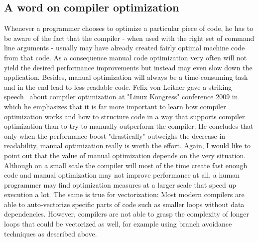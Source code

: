 \subsection{A word on compiler optimization}
Whenever a programmer chooses to optimize a particular piece of code, he has to be aware of the fact that the compiler - when used with the right set of command line arguments - usually may have already created fairly optimal machine code from that code. As a consequence manual code optimization very often will not yield the desired performance improvements but instead may even slow down the application. Besides, manual optimization will always be a time-consuming task and in the end lead to less readable code. Felix von Leitner gave a striking speech~\cite{leitner2009} about compiler optimization at "Linux Kongress" conference 2009 in which he emphasizes that it is far more important to learn how compiler optimization works and how to structure code in a way that supports compiler optimization than to try to manually outperform the compiler. He concludes that only when the performance boost "drastically" outweighs the decrease in readability, manual optimization really is worth the effort. Again, I would like to point out that the value of manual optimization depends on the very situation. Although on a small scale the compiler will most of the time create fast enough code and manual optimization may not improve performance at all, a human programmer may find optimization measures at a larger scale that speed up execution a lot. The same is true for vectorization: Most modern compilers are able to auto-vectorize specific parts of code such as smaller loops without data dependencies. However, compilers are not able to grasp the complexity of longer loops that could be vectorized as well, for example using branch avoidance techniques as described above.